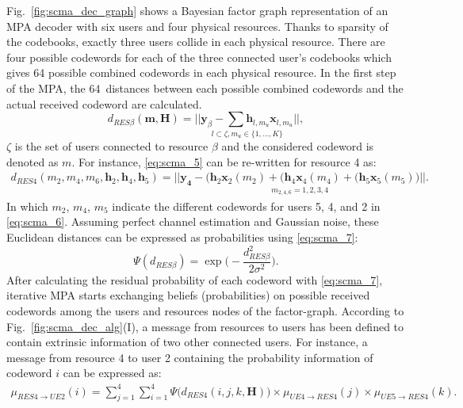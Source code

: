Fig.~\ref{fig:scma_dec_graph} shows a Bayesian factor graph representation of an
MPA decoder with six users and four physical resources. Thanks to sparsity of
the codebooks, exactly three users collide in each physical resource. There are
four possible codewords for each of the three connected user's codebooks which
gives 64 possible combined codewords in each physical resource. In the first
step of the MPA, the 64~distances between each possible combined codewords and
the actual received codeword are calculated.
\begin{equation}
  \label{eq:scma_5}
  d_{RES  \beta}(\bm{m}, \bm{H}) =
  \underset{l \subset \zeta, m_u\in\{1,...,K\}}{||\bm{y}_\beta -
  \sum \bm{h}_{l,m_u} \bm{x}_{l,m_u} ||},
\end{equation}
$\zeta$ is the set of users connected to resource $\beta$ and the
considered codeword is denoted as $m$. For instance, \eqref{eq:scma_5} can be
re-written for resource 4 as:
\begin{equation}
  \label{eq:scma_6}
  \begin{split}
  d_{RES 4}(m_2,m_4,m_6,\bm{h}_2, \bm{h}_4, \bm{h}_5) =
  \underset{m_{2,4,6}=1,2,3,4}{|| \bm{y_4} - \Big(\bm{h}_2\bm{x}_2(m_2) +
  (\bm{h}_4\bm{x}_4(m_4) + (\bm{h}_5\bm{x}_5(m_5) \Big) ||}.
  \end{split}
\end{equation}
In which $m_2$, $m_4$, $m_5$ indicate the different codewords for users 5, 4,
and 2 in \eqref{eq:scma_6}. Assuming perfect channel estimation and Gaussian
noise, these Euclidean distances can be expressed as probabilities using
\eqref{eq:scma_7}:
\begin{equation}
  \label{eq:scma_7}
  \Psi(d_{RES \beta}) = \exp \Bigg(-\frac{d_{RES \beta}^2}{2\sigma^2} \Bigg).
\end{equation}
After calculating the residual probability of each codeword with
\eqref{eq:scma_7}, iterative MPA starts exchanging beliefs (probabilities) on
possible received codewords among the users and resources nodes of the
factor-graph. According to Fig.~\ref{fig:scma_dec_alg}(I), a message from
resources to users has been defined to contain extrinsic information of two
other connected users. For instance, a message from resource 4 to user 2
containing the probability information of codeword $i$ can be expressed as:
\begin{equation}
  \label{eq:scma_8}
  \begin{split}
  \mu_{RES4 \rightarrow UE2}(i) = \sum\limits_{j=1}^4 \sum\limits_{i=1}^4 \Psi
  \Big(d_{RES4}(i,j,k,\bm{H}) \Big)
  \times \mu_{UE4 \rightarrow RES4}(j) \times \mu_{UE5 \rightarrow RES4}(k).
  \end{split}
\end{equation}
